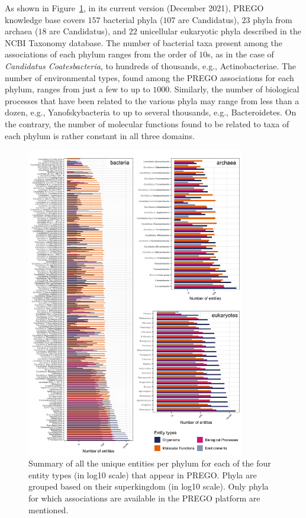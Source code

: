 {\begin{table}[h]
   \end{table}


   As shown in Figure~\ref{fig:prego-entities}, in its current version (December 2021), PREGO knowledge base covers $157$ bacterial phyla ($107$ are Candidatus), $23$ phyla from archaea ($18$ are Candidatus), and $22$ unicellular eukaryotic phyla described in the NCBI Taxonomy database. 
   The number of bacterial taxa present among the associations of each phylum ranges from the order of $10$s, as in the case of \textit{Candidatus Coatesbacteria}, to hundreds of thousands, e.g., Actinobacteriae. 
   The number of environmental types, found among the PREGO associations for each phylum, ranges from just a few to up to $1000$. 
   Similarly, the number of biological processes that have been related to the various phyla may range from less than a dozen, e.g., Yanofskybacteria to up to several thousands, e.g., Bacteroidetes. On the contrary, the number of molecular functions found to be related to taxa of each phylum is rather constant in all three domains.

   \begin{figure}
      \centering
      \includegraphics[width=0.85\textwidth]{figures/figure_5_all_channels_ranks.png}  
      \caption[Summary of the unique entities per phylum for each of the four entity types on PREGO]{Summary of all the unique entities per phylum for each of the four entity types (in log10 scale) that appear in PREGO. Phyla are grouped based on their superkingdom (in log10 scale). Only phyla for which associations are available in the PREGO platform are mentioned.
      }
      \label{fig:prego-entities}
   \end{figure}




}
